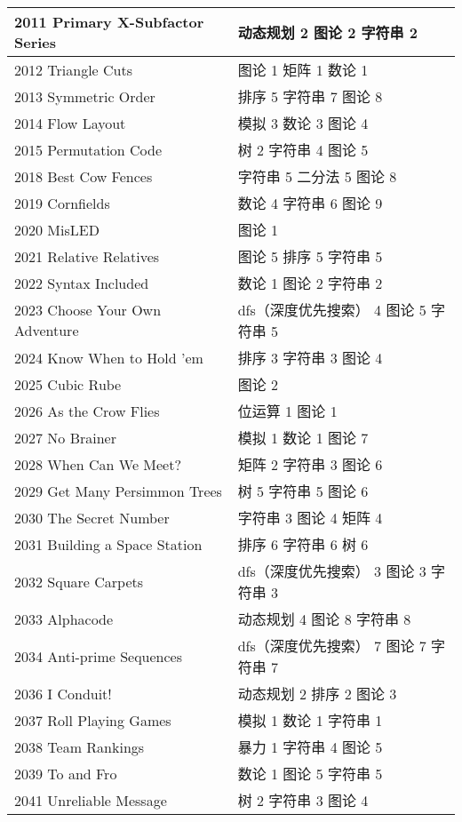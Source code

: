\begin{longtable}{| p{} | p{} |}
 2011 Primary X-Subfactor Series  & 动态规划 2 图论 2 字符串 2 \\ \hline
 2012 Triangle Cuts  & 图论 1 矩阵 1 数论 1 \\ \hline
 2013 Symmetric Order  & 排序 5 字符串 7 图论 8 \\ \hline
 2014 Flow Layout  & 模拟 3 数论 3 图论 4 \\ \hline
 2015 Permutation Code  & 树 2 字符串 4 图论 5 \\ \hline
 2018 Best Cow Fences  & 字符串 5 二分法 5 图论 8 \\ \hline
 2019 Cornfields  & 数论 4 字符串 6 图论 9 \\ \hline
 2020 MisLED  & 图论 1 \\ \hline
 2021 Relative Relatives  & 图论 5 排序 5 字符串 5 \\ \hline
 2022 Syntax Included  & 数论 1 图论 2 字符串 2 \\ \hline
 2023 Choose Your Own Adventure  & dfs（深度优先搜索） 4 图论 5 字符串 5 \\ \hline
 2024 Know When to Hold 'em  & 排序 3 字符串 3 图论 4 \\ \hline
 2025 Cubic Rube  & 图论 2 \\ \hline
 2026 As the Crow Flies  & 位运算 1 图论 1 \\ \hline
 2027 No Brainer  & 模拟 1 数论 1 图论 7 \\ \hline
 2028 When Can We Meet?  & 矩阵 2 字符串 3 图论 6 \\ \hline
 2029 Get Many Persimmon Trees  & 树 5 字符串 5 图论 6 \\ \hline
 2030 The Secret Number  & 字符串 3 图论 4 矩阵 4 \\ \hline
 2031 Building a Space Station  & 排序 6 字符串 6 树 6 \\ \hline
 2032 Square Carpets  & dfs（深度优先搜索） 3 图论 3 字符串 3 \\ \hline
 2033 Alphacode  & 动态规划 4 图论 8 字符串 8 \\ \hline
 2034 Anti-prime Sequences  & dfs（深度优先搜索） 7 图论 7 字符串 7 \\ \hline
 2036 I Conduit!  & 动态规划 2 排序 2 图论 3 \\ \hline
 2037 Roll Playing Games  & 模拟 1 数论 1 字符串 1 \\ \hline
 2038 Team Rankings  & 暴力 1 字符串 4 图论 5 \\ \hline
 2039 To and Fro  & 数论 1 图论 5 字符串 5 \\ \hline
 2041 Unreliable Message  & 树 2 字符串 3 图论 4 \\ \hline

\end{longtable}
